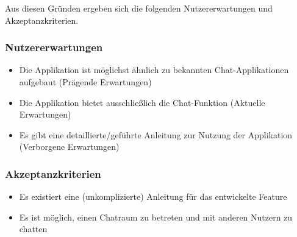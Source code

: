 \noindent{}Aus diesen Gründen ergeben sich die folgenden Nutzererwartungen und Akzeptanzkriterien.

\subsubsection{Nutzererwartungen}
\begin{itemize}
  \item Die Applikation ist möglichst ähnlich zu bekannten Chat-Applikationen aufgebaut (Prägende Erwartungen)
  \item Die Applikation bietet ausschließlich die Chat-Funktion (Aktuelle Erwartungen)
  \item Es gibt eine detaillierte/geführte Anleitung zur Nutzung der Applikation (Verborgene Erwartungen)
\end{itemize}

\subsubsection{Akzeptanzkriterien}
\begin{itemize}
  \item Es existiert eine (unkomplizierte) Anleitung für das entwickelte Feature
  \item Es ist möglich, einen Chatraum zu betreten und mit anderen Nutzern zu chatten
\end{itemize}

